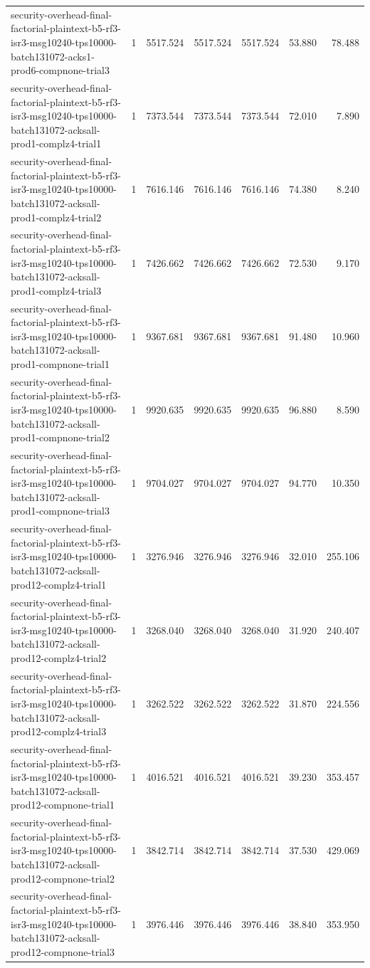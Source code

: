 \begin{tabular}{lrrrrrr}
security-overhead-final-factorial-plaintext-b5-rf3-isr3-msg10240-tps10000-batch131072-acks1-prod6-compnone-trial3 & 1 & 5517.524 & 5517.524 & 5517.524 & 53.880 & 78.488 \\
security-overhead-final-factorial-plaintext-b5-rf3-isr3-msg10240-tps10000-batch131072-acksall-prod1-complz4-trial1 & 1 & 7373.544 & 7373.544 & 7373.544 & 72.010 & 7.890 \\
security-overhead-final-factorial-plaintext-b5-rf3-isr3-msg10240-tps10000-batch131072-acksall-prod1-complz4-trial2 & 1 & 7616.146 & 7616.146 & 7616.146 & 74.380 & 8.240 \\
security-overhead-final-factorial-plaintext-b5-rf3-isr3-msg10240-tps10000-batch131072-acksall-prod1-complz4-trial3 & 1 & 7426.662 & 7426.662 & 7426.662 & 72.530 & 9.170 \\
security-overhead-final-factorial-plaintext-b5-rf3-isr3-msg10240-tps10000-batch131072-acksall-prod1-compnone-trial1 & 1 & 9367.681 & 9367.681 & 9367.681 & 91.480 & 10.960 \\
security-overhead-final-factorial-plaintext-b5-rf3-isr3-msg10240-tps10000-batch131072-acksall-prod1-compnone-trial2 & 1 & 9920.635 & 9920.635 & 9920.635 & 96.880 & 8.590 \\
security-overhead-final-factorial-plaintext-b5-rf3-isr3-msg10240-tps10000-batch131072-acksall-prod1-compnone-trial3 & 1 & 9704.027 & 9704.027 & 9704.027 & 94.770 & 10.350 \\
security-overhead-final-factorial-plaintext-b5-rf3-isr3-msg10240-tps10000-batch131072-acksall-prod12-complz4-trial1 & 1 & 3276.946 & 3276.946 & 3276.946 & 32.010 & 255.106 \\
security-overhead-final-factorial-plaintext-b5-rf3-isr3-msg10240-tps10000-batch131072-acksall-prod12-complz4-trial2 & 1 & 3268.040 & 3268.040 & 3268.040 & 31.920 & 240.407 \\
security-overhead-final-factorial-plaintext-b5-rf3-isr3-msg10240-tps10000-batch131072-acksall-prod12-complz4-trial3 & 1 & 3262.522 & 3262.522 & 3262.522 & 31.870 & 224.556 \\
security-overhead-final-factorial-plaintext-b5-rf3-isr3-msg10240-tps10000-batch131072-acksall-prod12-compnone-trial1 & 1 & 4016.521 & 4016.521 & 4016.521 & 39.230 & 353.457 \\
security-overhead-final-factorial-plaintext-b5-rf3-isr3-msg10240-tps10000-batch131072-acksall-prod12-compnone-trial2 & 1 & 3842.714 & 3842.714 & 3842.714 & 37.530 & 429.069 \\
security-overhead-final-factorial-plaintext-b5-rf3-isr3-msg10240-tps10000-batch131072-acksall-prod12-compnone-trial3 & 1 & 3976.446 & 3976.446 & 3976.446 & 38.840 & 353.950 \\

\end{tabular}
